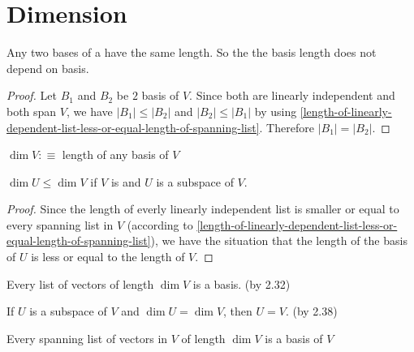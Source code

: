 \section{Dimension}

\setcounter{thm}{33}
\begin{thm} Any two bases of a \fdvs have the same length. So the the basis length does not depend on basis.
\end{thm}
\begin{proof}
  Let $B_1$ and $B_2$ be $2$ basis of $V$. Since both are linearly independent and both span $V$, we have $|B_1| \leq |B_2|$ and $|B_2| \leq |B_1|$ by using \ref{length-of-linearly-dependent-list-less-or-equal-length-of-spanning-list}. Therefore $|B_1|=|B_2|.$
\end{proof}

\begin{mydef} [Dimension]
	$\dim V :\equiv$ length of any basis of $V$
\end{mydef}

\setcounter{thm}{36}
\begin{thm} $\dim U \leq \dim V$ if $V$ is \fd  and $U$ is a subspace of $V$.
\end{thm}
\begin{proof}
  Since the length of everly linearly independent list is smaller or equal to every spanning list in $V$ (according to \ref{length-of-linearly-dependent-list-less-or-equal-length-of-spanning-list}), we have the situation that the length of the basis of $U$ is less or equal to the length of $V$.
\end{proof}


\begin{thm}
  \label{every-lid-list-of-length-dim-v-is -a-basis-of-v}
  Every \lid list of vectors of length $\dim V$ is a basis. (by 2.32)
\end{thm}

\begin{thm} If $U$ is a subspace of $V$ and $\dim U = \dim V$, then $U=V$. (by 2.38)
\end{thm}

\setcounter{thm}{41}
\begin{thm}
  Every spanning list of vectors in $V$ of length $\dim V$ is a basis of $V$
\end{thm}

